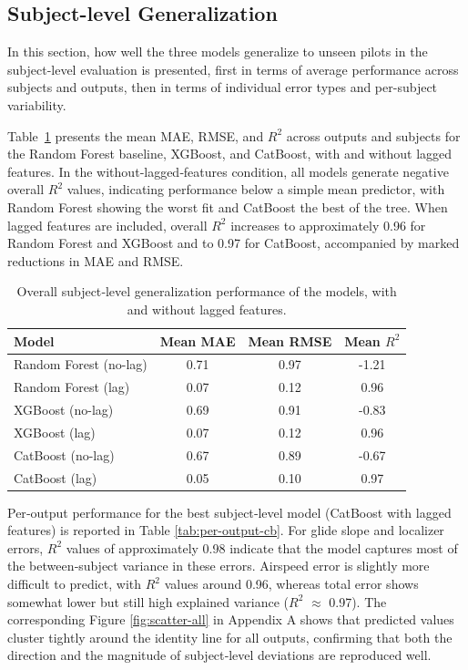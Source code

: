 \documentclass[11pt, a4paper]{article}
\begin{document}
\subsection{Subject-level Generalization}
In this section, how well the three models generalize to unseen pilots in the subject-level evaluation is presented, first in terms of average performance across subjects and outputs, then in terms of individual error types and per-subject variability.

Table~\ref{tab:sub-overall} presents the mean MAE, RMSE, and $R^2$ across outputs and subjects for the Random Forest baseline, XGBoost, and CatBoost, with and without lagged features. In the without‑lagged‑features condition, all models generate negative overall $R^2$ values, indicating performance below a simple mean predictor, with Random Forest showing the worst fit and CatBoost the best of the tree. When lagged features are included, overall $R^2$ increases to approximately 0.96 for Random Forest and XGBoost and to 0.97 for CatBoost, accompanied by marked reductions in MAE and RMSE.

\begin{table}[htbp]
	\caption{Overall subject‑level generalization performance of the models, with and without lagged features.}
	\label{tab:sub-overall}
	\centering
	\small
	\begin{tabular}{lccc}
		\toprule                                 	
		Model          	&  Mean MAE      &  Mean RMSE      & Mean $R^2$ \\ 
		\midrule
		Random Forest (no-lag)  	& 0.71  	& 0.97  & -1.21 \\
		Random Forest (lag)         & 0.07 	& 0.12 & 0.96 \\
		\midrule
		XGBoost (no-lag)  	& 0.69  	& 0.91  & -0.83\\
		XGBoost (lag)         & 0.07 	& 0.12 & 0.96 \\
		\midrule
		CatBoost (no-lag)  	& 0.67  	& 0.89 & -0.67 \\
		CatBoost (lag)         & 0.05 	& 0.10 & 0.97\\ 
		\bottomrule
	\end{tabular}
\end{table}

Per‑output performance for the best subject‑level model (CatBoost with lagged features) is reported in Table \ref{tab:per-output-cb}. For glide slope and localizer errors, $R^2$ values of approximately 0.98 indicate that the model captures most of the between‑subject variance in these errors. Airspeed error is slightly more difficult to predict, with $R^2$ values around 0.96, whereas total error shows somewhat lower but still high explained variance ($R^2$ $\approx$ 0.97). The corresponding Figure \ref{fig:scatter-all} in Appendix A shows that predicted values cluster tightly around the identity line for all outputs, confirming that both the direction and the magnitude of subject‑level deviations are reproduced well.
\end{document}
